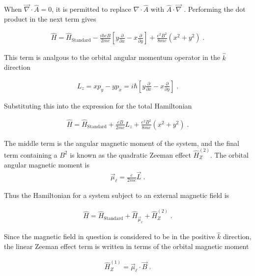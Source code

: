         \noindent When $\vec{\nabla} \cdot \hat{A} = 0$, it is permitted to replace $\nabla \cdot \hat{A}$ with $\hat{A} \cdot \vec{\nabla}$ \cite{Sakurai_Napolitano_2020}. Performing the dot product in the next term gives 

        \begin{align}
            \hat{H} =  \hat{H}_{\text{Standard}} - \frac{i\hbar e B}{2mc} \left[y \frac{\partial}{\partial x} - x \frac{\partial}{\partial y} \right]+ \frac{e^2B^2}{8mc} \left(x^2 + y^2\right)\;.
        \end{align}

        
        \noindent This term is analgous to the orbital angular momentum operator in the $\hat{k}$ direction 

        \begin{align}
            L_z = xp_y - yp_x = i\hbar \left[y \frac{\partial}{\partial x} - x \frac{\partial}{\partial y} \right]\;.
        \end{align}

        
        \noindent Substituting this into the expression for the total Hamiltonian

        \begin{align}
            \hat{H} =  \hat{H}_{\text{Standard}} + \frac{eB}{2mc} L_z + \frac{e^2B^2}{8mc} \left(x^2 + y^2\right)\;.
        \end{align}

        \noindent The middle term is the angular magnetic moment of the system, and the final term containing a $B^2$ is known as the quadratic Zeeman effect $\hat{H}_Z^{(2)}$. The orbital angular magnetic moment is \cite{Basdevant_Dalibard_2002}
        \begin{align}
            \vec{\mu}_\ell = \frac{e}{2mc} \vec{L}\;.
        \end{align}
        
        \noindent Thus the Hamiltonian for a system subject to an external magnetic field is

        \begin{align}
            \hat{H} =  \hat{H}_{\text{Standard}} + \hat{H}_{\vec{\mu}_\ell} + \hat{H}_Z^{(2)} \;.
        \end{align}

        \noindent Since the magnetic field in question is considered to be in the positive $\hat{k}$ direction, the linear Zeeman effect term is written in terms of the orbital magnetic moment 

        \begin{align}
            \hat{H}_Z^{(1)} = \vec{\mu}_\ell \cdot \vec{B}\;.
        \end{align}

